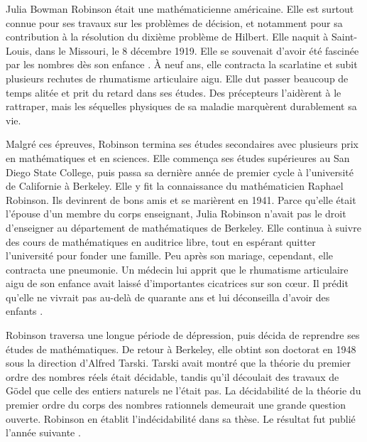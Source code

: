 \documentclass[../../../include/open-logic-section]{subfiles}
\begin{document}



Julia Bowman Robinson était une mathématicienne américaine.
Elle est surtout connue pour ses travaux sur les problèmes de décision,
et notamment pour sa contribution à la résolution du dixième problème
de Hilbert. Elle naquit à Saint-Louis, dans le Missouri, le
8 décembre 1919. Elle se souvenait d'avoir été fascinée par les
nombres dès son enfance \citep[4]{Reid1986}. À neuf ans, elle contracta
la scarlatine et subit plusieurs rechutes de rhumatisme articulaire
aigu. Elle dut passer beaucoup de temps alitée et prit du retard dans
ses études. Des précepteurs l'aidèrent à le rattraper, mais les
séquelles physiques de sa maladie marquèrent durablement sa vie.

Malgré ces épreuves, Robinson termina ses études secondaires avec
plusieurs prix en mathématiques et en sciences. Elle commença ses
études supérieures au San Diego State College, puis passa sa dernière
année de premier cycle à l'université de Californie à Berkeley. Elle
y fit la connaissance du mathématicien Raphael Robinson. Ils devinrent
de bons amis et se marièrent en 1941. Parce qu'elle était l'épouse
d'un membre du corps enseignant, Julia Robinson n'avait pas le droit
d'enseigner au département de mathématiques de Berkeley. Elle continua
à suivre des cours de mathématiques en auditrice libre, tout en
espérant quitter l'université pour fonder une famille. Peu après son
mariage, cependant, elle contracta une pneumonie. Un médecin lui
apprit que le rhumatisme articulaire aigu de son enfance avait laissé
d'importantes cicatrices sur son cœur. Il prédit qu'elle ne vivrait
pas au-delà de quarante ans et lui déconseilla d'avoir des enfants
\citep[13]{Reid1986}.

Robinson traversa une longue période de dépression, puis décida de
reprendre ses études de mathématiques. De retour à Berkeley, elle
obtint son doctorat en 1948 sous la direction d'Alfred Tarski. Tarski
avait montré que la théorie du premier ordre des nombres réels était
décidable, tandis qu'il découlait des travaux de Gödel que celle des
entiers naturels ne l'était pas. La décidabilité de la théorie du
premier ordre du corps des nombres rationnels demeurait une grande
question ouverte. Robinson en établit l'indécidabilité dans sa thèse.
Le résultat fut publié l'année suivante \citeyearpar{Robinson1949}.
\end{document}

